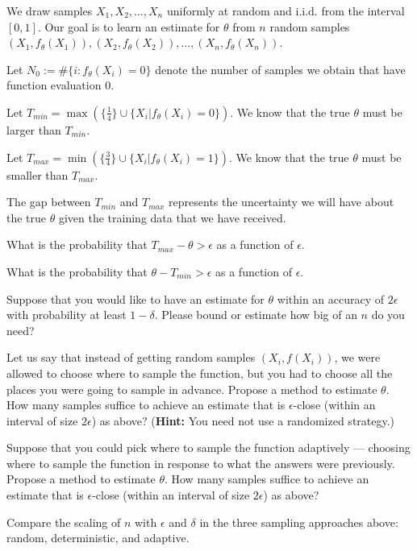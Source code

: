 \documentclass[11pt]{article}
\begin{document}
We draw samples $X_1, X_2, \ldots, X_n$ uniformly at random and i.i.d. from the interval $[0,1]$.
Our goal is to learn an estimate for $\theta$ from $n$ random samples $(X_1, f_{\theta}(X_1)), (X_2, f_{\theta}(X_2)), \ldots, (X_n, f_{\theta}(X_n))$.

Let $N_0 := \#\{i: f_{\theta}(X_i) = 0\}$ denote the number of samples
we obtain that have function evaluation $0$.

Let $T_{min} = \max(\{\frac{1}{4}\} \cup \{ X_i | f_\theta(X_i) = 0\})$. We know that the
true $\theta$ must be larger than $T_{min}$. 

Let $T_{max} = \min(\{\frac{3}{4}\} \cup \{ X_i | f_\theta(X_i) = 1\})$. We know that the
true $\theta$ must be smaller than $T_{max}$. 

The gap between $T_{min}$ and $T_{max}$ represents the uncertainty we
will have about the true $\theta$ given the training data that we have
received. 

\begin{Parts}

\Part What is the probability that $T_{max} - \theta > \epsilon$ as a
function of $\epsilon$. 



\Part What is the probability that $\theta - T_{min} > \epsilon$ as a
function of $\epsilon$. 



\Part Suppose that you would like to have an estimate for $\theta$
within an accuracy of $2\epsilon$ with probability at least
$1-\delta$. Please bound or estimate how big of an $n$ do you need? 



\Part Let us say that instead of getting random samples $(X_i, f(X_i))$,
we were allowed to choose where to sample the function, but you had to
choose all the places you were going to sample in advance. Propose a
method to estimate $\theta$. How many samples suffice to achieve an
estimate that is $\epsilon$-close (within an interval of size
$2\epsilon$) as above? ({\bf Hint:} You need not use a randomized
strategy.)  



\Part Suppose that you could pick where to sample the function
adaptively --- choosing where to sample the function in response to
what the answers were previously. Propose a method to estimate
$\theta$. How many samples suffice to achieve an estimate that is
$\epsilon$-close (within an interval of size $2\epsilon$) as above?



\Part Compare the scaling of $n$ with $\epsilon$ and $\delta$ in the
three sampling approaches above: random, deterministic, and adaptive. 

















\end{Parts}
\end{document}
